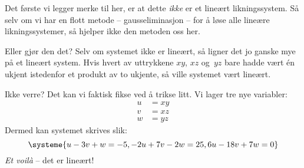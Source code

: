 \begin{losning}
Det første vi legger merke til her, er at dette \emph{ikke} er et
lineært likningssystem.  Så selv om vi har en flott metode --
gausseliminasjon -- for å løse alle lineære likningssystemer, så
hjelper ikke den metoden oss her.

Eller gjør den det?  Selv om systemet ikke er lineært, så ligner det
jo ganske mye på et lineært system.  Hvis hvert av uttrykkene $xy$,
$xz$ og~$yz$ bare hadde vært én ukjent istedenfor et produkt av to
ukjente, så ville systemet vært lineært.

Ikke verre?  Det kan vi faktisk fikse ved å trikse litt.  Vi lager tre
nye variabler:
\begin{align*}
  u &= xy \\
  v &= xz \\
  w &= yz
\end{align*}
Dermed kan systemet skrives slik:
\[
\systeme{
    u -  3v +  w = -5,
  -2u +  7v - 2w = 25,
   6u - 18v + 7w = 0
}
\]
\emph{Et voilà} -- det er lineært!


\end{losning}
